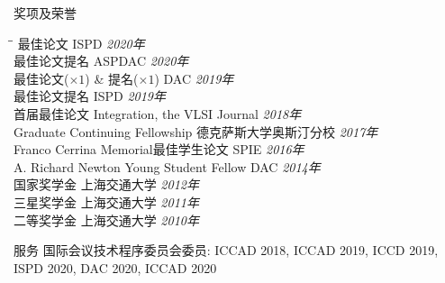 
\begin{rSection}{奖项及荣誉}
\begin{tabbing}
\hspace{3.3in}\= \hspace{3.1in}\= \kill
最佳论文 \> ISPD \> {\em 2020年 } \\
最佳论文提名 \> ASPDAC \> {\em 2020年 } \\
最佳论文($\times 1$) \& 提名($\times 1$) \> DAC \> {\em 2019年 } \\
最佳论文提名 \> ISPD \> {\em 2019年 } \\
首届最佳论文 \> Integration, the VLSI Journal \> {\em 2018年 } \\
Graduate Continuing Fellowship \> 德克萨斯大学奥斯汀分校 \> {\em 2017年 } \\
Franco Cerrina Memorial最佳学生论文 \> SPIE \> {\em 2016年 } \\
A. Richard Newton Young Student Fellow \> DAC \> {\em 2014年 } \\
国家奖学金 \> 上海交通大学 \> {\em 2012年 } \\
三星奖学金 \> 上海交通大学 \> {\em 2011年 } \\
二等奖学金 \> 上海交通大学 \> {\em 2010年 }
\end{tabbing}
\end{rSection}

\begin{rSection}{服务}
国际会议技术程序委员会委员: ICCAD 2018, ICCAD 2019, ICCD 2019, ISPD 2020, DAC 2020, ICCAD 2020
\end{rSection}
